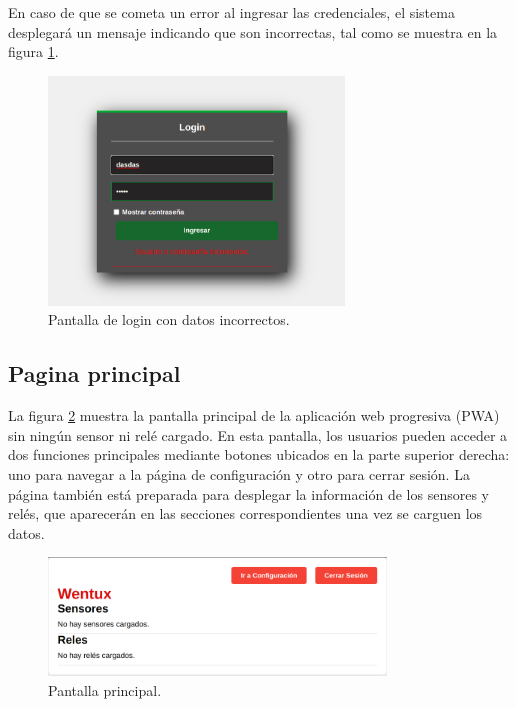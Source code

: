En caso de que se cometa un error al ingresar las credenciales, el sistema desplegará un mensaje indicando que son incorrectas, tal como se muestra en la figura \ref{fig:login_inc}.


\begin{figure}[H]
\centering 
\includegraphics[width=0.7\textwidth]{./Figures/login_inc.png}
\caption{Pantalla de login con datos incorrectos.}
\label{fig:login_inc}
\end{figure}

\subsection{Pagina principal}

La figura \ref{fig:home_ini} muestra la pantalla principal de la aplicación web progresiva (PWA) sin ningún sensor ni relé cargado. En esta pantalla, los usuarios pueden acceder a dos funciones principales mediante botones ubicados en la parte superior derecha: uno para navegar a la página de configuración y otro para cerrar sesión. La página también está preparada para desplegar la información de los sensores y relés, que aparecerán en las secciones correspondientes una vez se carguen los datos.

\begin{figure}[H]
\centering 
\includegraphics[width=0.8\textwidth]{./Figures/home_ini.png}
\caption{Pantalla principal.}
\label{fig:home_ini}
\end{figure}

